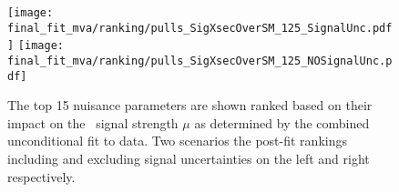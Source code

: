 \begin{figure}[hb]
  \centering
  \texttt{[image: final\_fit\_mva/ranking/pulls\_SigXsecOverSM\_125\_SignalUnc.pdf]}
  \texttt{[image: final\_fit\_mva/ranking/pulls\_SigXsecOverSM\_125\_NOSignalUnc.pdf]}
  \caption{The top 15 nuisance parameters are shown ranked based on their impact
  on the \VHbb\ signal strength $\mu$ as determined by the combined
  unconditional fit to data. Two scenarios the post-fit rankings including and
  excluding signal uncertainties on the left and right respectively.}
  \label{fig:Rank_012L_MVAVH}
\end{figure}